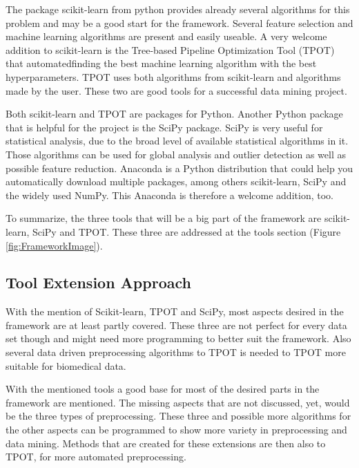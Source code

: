 \documentclass[10pt,a4paper]{article}
\begin{document}
	The package scikit-learn from python provides already several algorithms for this problem and may be a good start for the framework. Several feature selection and machine learning algorithms are present and easily useable. A very welcome addition to scikit-learn is the Tree-based Pipeline Optimization Tool (TPOT) that automatedfinding the best machine learning algorithm with the best hyperparameters. TPOT uses both algorithms from scikit-learn and algorithms made by the user. These two are good tools for a successful data mining project.
	
	Both scikit-learn and TPOT are packages for Python. Another Python package that is helpful for the project is the SciPy package. SciPy is very useful for statistical analysis, due to the broad level of available statistical algorithms in it. Those algorithms can be used for global analysis and outlier detection as well as possible feature reduction. Anaconda is a Python distribution that could help you automatically download multiple packages, among others scikit-learn, SciPy and the widely used NumPy. This Anaconda is therefore a welcome addition, too.
	
	To summarize, the three tools that will be a big part of the framework are scikit-learn, SciPy and TPOT. These three are addressed at the tools section (Figure \ref{fig:FrameworkImage}).
	
	\subsection{Tool Extension Approach}
	\label{subsec:ToolExtensionDrivenApproach}
	
	With the mention of Scikit-learn, TPOT and SciPy, most aspects desired in the framework are at least partly covered. These three are not perfect for every data set though and might need more programming to better suit the framework. Also several data driven preprocessing algorithms to TPOT is needed to TPOT more suitable for biomedical data. 
	
	With the mentioned tools a good base for most of the desired parts in the framework are mentioned. The missing aspects that are not discussed, yet, would be the three types of preprocessing. These three and possible more algorithms for the other aspects can be programmed to show more variety in preprocessing and data mining. Methods that are created for these extensions are then also to TPOT, for more automated preprocessing.
	
\end{document}
